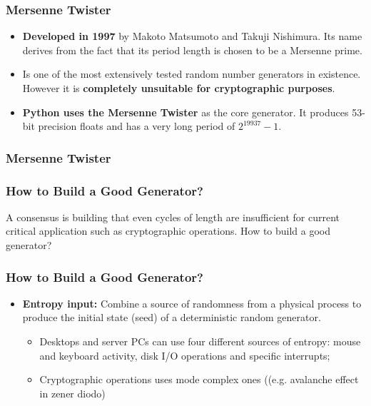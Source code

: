 \begin{frame}
    \frametitle{Mersenne Twister}
    
    \begin{itemize}

        \item \textbf{Developed in 1997} by Makoto Matsumoto and Takuji Nishimura. Its name 
        derives from the fact that its period length is chosen to be a Mersenne prime.

        \item Is one of the most extensively tested random number generators in existence. 
        However it is \textbf{completely unsuitable for cryptographic purposes}.

        \item \textbf{Python uses the Mersenne Twister} as the core generator. It produces 53-bit precision 
        floats and has a very long period of $2^{19937}-1$.

    \end{itemize}


\end{frame}


\begin{frame}
    \frametitle{Mersenne Twister}
    
    \begin{itemize}


    \end{itemize}


\end{frame}


\begin{frame}
    \frametitle{How to Build a Good Generator?}
    

    A consensus is building that even cycles of length are
    insufficient for current critical application such as cryptographic operations. How
    to build a good generator?

\end{frame}

\begin{frame}
    \frametitle{How to Build a Good Generator?}

    \begin{itemize}

        \item \textbf{Entropy input:} Combine a source of randomness from a physical process 
        to produce the initial state (seed) of a deterministic random generator.
        \begin{itemize}
            \item Desktops and server PCs can use four different sources of entropy: mouse
            and keyboard activity, disk I/O operations and specific interrupts;
            \item Cryptographic operations uses mode complex ones ((e.g. avalanche effect in zener diodo)
        \end{itemize}
        

    \end{itemize}
\end{frame}


